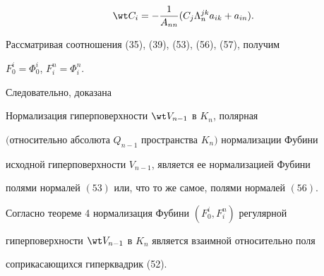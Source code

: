\begin{equation} 


\wt C_i=-\frac{1}{A_{nn}}(C_j\Lambda^{jk}_n a_{ik}+a_{in}). 


\end{equation} 


Рассматривая соотношения (35), (39), (53), (56), (57), получим 


$F^i_0=\Phi^i_0$, $F^n_i=\Phi^n_i$. 


 


Следовательно, доказана 


 


\begin{thm} 


Нормализация гиперповерхности $\wt V_{n-1}$ в $K_n$, полярная 


$($относительно абсолюта $Q_{n-1}$ пространства $K_n)$ нормализации Фубини 


исходной гиперповерхности $V_{n-1}$, является ее нормализацией Фубини 


полями нормалей $(53)$ или, что то же самое, полями нормалей $(56)$. 


\end{thm} 


 


Согласно теореме 4 нормализация Фубини $(F^i_0,F^n_i)$ регулярной 


гиперповерхности $\wt V_{n-1}$ в $K_n$ является взаимной относительно поля 


соприкасающихся гиперквадрик (52). 


 


